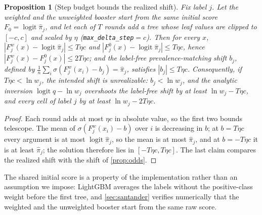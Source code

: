 \documentclass[sigconf,nonacm]{acmart}
\newtheorem{proposition}{Proposition}
\begin{document}
\begin{proposition}[Step budget bounds the realized shift]
\label{prop:budget}
Fix label $j$. Let the weighted and the unweighted booster start from the same initial score $F_0=\operatorname{logit}\hat\pi_j$, and let each of $T$ rounds add a tree whose leaf values are clipped to $[-c,c]$ and scaled by $\eta$ (\texttt{max\_delta\_step}$=c$). Then for every $x$, $|F^{w}_j(x)-\operatorname{logit}\hat\pi_j|\le T\eta c$ and $|F^{0}_j(x)-\operatorname{logit}\hat\pi_j|\le T\eta c$, hence $|F^{w}_j(x)-F^{0}_j(x)|\le 2T\eta c$; and the label-free prevalence-matching shift $b_j$, defined by $\frac1n\sum_i\sigma(F^{w}_j(x_i)-b_j)=\hat\pi_j$, satisfies $|b_j|\le T\eta c$. Consequently, if $T\eta c<\ln w_j$, the intended shift is unrealizable: $b_j<\ln w_j$, and the analytic inversion $\operatorname{logit}q-\ln w_j$ overshoots the label-free shift by at least $\ln w_j-T\eta c$, and every cell of label $j$ by at least $\ln w_j-2T\eta c$.
\end{proposition}
\begin{proof}
Each round adds at most $\eta c$ in absolute value, so the first two bounds telescope. The mean of $\sigma(F^{w}_j(x_i)-b)$ over $i$ is decreasing in $b$; at $b=T\eta c$ every argument is at most $\operatorname{logit}\hat\pi_j$, so the mean is at most $\hat\pi_j$, and at $b=-T\eta c$ it is at least $\hat\pi_j$; the solution therefore lies in $[-T\eta c,T\eta c]$. The last claim compares the realized shift with the shift of \cref{prop:odds}.
\end{proof}
The shared initial score is a property of the implementation rather than an assumption we impose: LightGBM averages the labels without the positive-class weight before the first tree, and \cref{sec:santander} verifies numerically that the weighted and the unweighted booster start from the same raw score.
\end{document}
